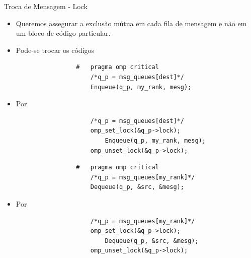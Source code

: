 	\begin{frame}[fragile]{Troca de Mensagem -  Lock}
		\begin{itemize}
			\item Queremos assegurar a exclusão mútua em cada fila de mensagem e não em um bloco de código particular.
			\item Pode-se trocar os códigos
		\end{itemize}

		\begin{multicols}{2}
				\begin{verbatim}
					#	pragma omp critical
						/*q_p = msg_queues[dest]*/
						Enqueue(q_p, my_rank, mesg);
				\end{verbatim}
			\begin{itemize}
				\item Por
			\end{itemize}
				\begin{verbatim}
						/*q_p = msg_queues[dest]*/
						omp_set_lock(&q_p->lock);
							Enqueue(q_p, my_rank, mesg);
						omp_unset_lock(&q_p->lock);
				\end{verbatim}
		\columnbreak
						\pause
				\begin{verbatim}
					#	pragma omp critical
						/*q_p = msg_queues[my_rank]*/
						Dequeue(q_p, &src, &mesg);
				\end{verbatim}
			\begin{itemize}
				\item Por
			\end{itemize}
				\begin{verbatim}
						/*q_p = msg_queues[my_rank]*/
						omp_set_lock(&q_p->lock);
							Dequeue(q_p, &src, &mesg);
						omp_unset_lock(&q_p->lock);
				\end{verbatim}
		\end{multicols}
\end{frame}


